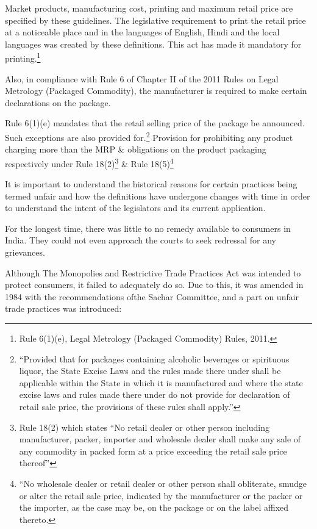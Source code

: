 \begin{multicols}{2}
\vspace{-.1cm}

\noi
Market products, manufacturing cost, printing and maximum retail price are specified by these
guidelines. The legislative requirement to print the retail price at a noticeable place and in the
languages of English, Hindi and the local languages was created by these definitions. This act
has made it mandatory for printing.\footnote{Rule 6(1)(e), Legal Metrology (Packaged Commodity) Rules, 2011.}


\noi
Also, in compliance with Rule 6 of Chapter II of the 2011 Rules on Legal Metrology (Packaged
Commodity), the manufacturer is required to make certain declarations on the package.

\noi
Rule 6(1)(e) mandates that the retail selling price of the package be announced. Such
exceptions are also provided for.\footnote{“Provided that for packages containing alcoholic beverages or spirituous liquor, the State Excise Laws and the rules made there under shall be applicable within the State in which it is manufactured and where the state excise laws and rules made there under do not provide for declaration of retail sale price, the provisions of these rules shall apply.”} Provision for prohibiting any product charging more than the MRP \& obligations on the product packaging respectively under Rule 18(2)\footnote{Rule 18(2) which states “No retail dealer or other person including manufacturer, packer, importer and wholesale dealer shall make any sale of any commodity in packed form at a price exceeding the retail sale price thereof”} \& Rule 18(5)\footnote{“No wholesale dealer or retail dealer or other person shall obliterate, smudge or alter the retail sale price, indicated by the manufacturer or the packer or the importer, as the case may be, on the package or on the label affixed thereto.}


\noi
It is important to understand the historical reasons for certain practices being termed unfair and
how the definitions have undergone changes with time in order to understand the intent of the
legislators and its current application.

\noi
For the longest time, there was little to no remedy available to consumers in India. They could
not even approach the courts to seek redressal for any grievances.

\noi
Although The Monopolies and Restrictive Trade Practices Act was intended to protect
consumers, it failed to adequately do so. Due to this, it was amended in 1984 with the
recommendations ofthe Sachar Committee, and a part on unfair trade practices was introduced:


\end{multicols}
